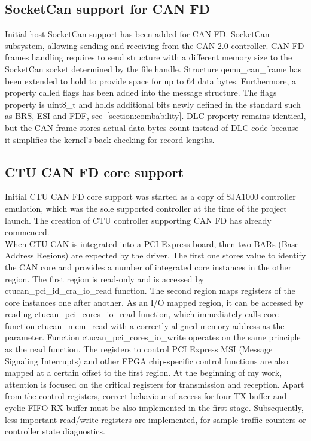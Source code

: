 \documentclass{ctuthesis}
\begin{document}
 \subsection{SocketCan support for CAN FD}
  Initial host SocketCan support has been added for CAN FD. SocketCan subsystem, allowing sending and receiving from the CAN 2.0 controller. CAN FD frames handling requires to send structure with a different memory size to the SocketCan socket determined by the file handle. Structure qemu\_can\_frame has been extended to hold to provide space for up to 64 data bytes. Furthermore, a property called flags has been added into the message structure. The flags property is uint8\_t and holds additional bits newly defined in the standard such as BRS, ESI and FDF, see~\ref{section:combability}. DLC property remains identical, but the CAN frame stores actual data bytes count instead of DLC code because it simplifies the kernel's back-checking for record lengths.

 \subsection{CTU CAN FD core support}
  Initial CTU CAN FD core support was started as a copy of SJA1000 controller emulation, which was the sole supported controller at the time of the project launch. The creation of CTU controller supporting CAN FD  has already commenced. \\
  When CTU CAN is integrated into a PCI Express board, then two BARs (Base Address Regions) are expected by the driver. The first one stores value to identify the CAN core and provides a number of integrated core instances in the other region. The first region is read-only and is accessed by ctucan\_pci\_id\_cra\_io\_read function. The second region maps registers of the core instances one after another. As an I/O mapped region, it can be accessed by reading ctucan\_pci\_cores\_io\_read function, which immediately calls core function ctucan\_mem\_read with a correctly aligned memory address as the parameter. Function ctucan\_pci\_cores\_io\_write operates on the same principle as the read function. The registers to control PCI Express MSI (Message Signaling Interrupts) and other FPGA chip-specific control functions are also mapped at a certain offset to the first region. At the beginning of my work, attention is focused on the critical registers for transmission and reception. Apart from the control registers, correct behaviour of access for four TX buffer and cyclic FIFO RX buffer must be also implemented in the first stage. Subsequently, less important read/write registers are implemented, for sample traffic counters or controller state diagnostics.
 
\end{document}
